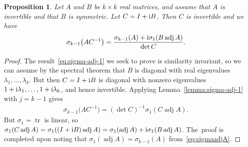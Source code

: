 \documentclass[10pt,a4paper]{amsart}
\def\adj{\operatorname{adj}}
\def\tr{\operatorname{tr}}
\newtheorem{Proposition}[Theorem]{Proposition}
\numberwithin{equation}{section}
\begin{document}
\begin{Proposition} \label{prop:sigma-adj-1}
Let $A$ and $B$ be $k \times k$ \emph{real} matrices, and assume that $A$ is invertible and that $B$ is symmetric. Let $C = I + {\rm i} B$. Then $C$ is invertible and we have
\begin{gather} \label{eq:sigma-adj-1}
\sigma_{k-1} \big(AC^{-1}\big) = \frac{\sigma_{k-1} (A) + {\rm i} \sigma_1 (B \adj A)}{\det C}.
\end{gather}
\end{Proposition}
\begin{proof}
The result~\eqref{eq:sigma-adj-1} we seek to prove is similarity invariant, so we can assume by the spectral theorem that $B$ is diagonal with real eigenvalues $\lambda_1, \dots, \lambda_k$. But then $C = I + {\rm i} B$ is diagonal with nonzero eigenvalues $1 + {\rm i} \lambda_1, \dots, 1 + {\rm i} \lambda_k$, and hence invertible. Applying Lemma~\ref{lemma:sigma-adj-1} with $j = k-1$ gives
\begin{gather*}
\sigma_{k-1} \big(A C^{-1}\big) = (\det C)^{-1} \sigma_1 (C \adj A).
\end{gather*}
But $\sigma_1 = \tr$ is linear, so $\sigma_1 (C \adj A) = \sigma_1 ( (I + {\rm i} B) \adj A) = \sigma_1 (\adj A) + {\rm i} \sigma_1 (B \adj A)$. The~proof is completed upon noting that $\sigma_1 (\adj A) = \sigma_{k-1} (A)$ from~\eqref{eq:sigmaadjA}.
\end{proof}
\end{document}
